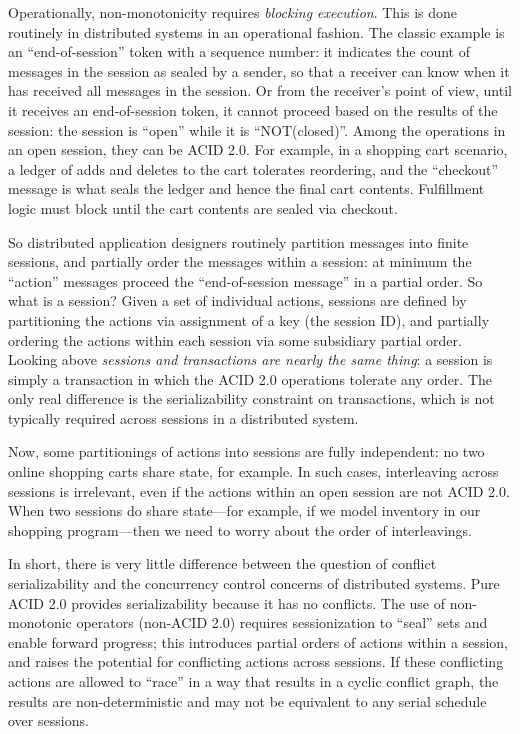 \documentclass{sig-alternate}
\begin{document}
Operationally, non-monotonicity requires \emph{blocking execution}. This is done
routinely in distributed systems in an operational fashion.  The classic example
is an ``end-of-session'' token with a sequence number: it indicates the count of
messages in the session as sealed by a sender, so that a receiver can know when
it has received all messages in the session.  Or from the receiver's point of
view, until it receives an end-of-session token, it cannot proceed based on the
results of the session: the session is ``open'' while it is ``NOT(closed)''.
Among the operations in an open session, they can be ACID 2.0.  For example, in
a shopping cart scenario, a ledger of adds and deletes to the cart tolerates
reordering, and the ``checkout'' message is what seals the ledger and hence the
final cart contents.  Fulfillment logic must block until the cart contents are
sealed via checkout.

So distributed application designers routinely partition messages into finite
sessions, and partially order the messages within a session: at minimum the
``action'' messages proceed the ``end-of-session message'' in a partial order.
So what is a session?  Given a set of individual actions, sessions are defined
by partitioning the actions via assignment of a key (the session ID), and
partially ordering the actions within each session via some subsidiary partial
order.  Looking above \emph{sessions and transactions are nearly the same
  thing}: a session is simply a transaction in which the ACID 2.0 operations
tolerate any order.  The only real difference is the serializability constraint
on transactions, which is not typically required across sessions in a
distributed system.

Now, some partitionings of actions into sessions are fully independent: no two
online shopping carts share state, for example.  In such cases, interleaving
across sessions is irrelevant, even if the actions within an open session are
not ACID 2.0.  When two sessions do share state---for example, if we model
inventory in our shopping program---then we need to worry about the order of
interleavings.

In short, there is very little difference between the question of conflict
serializability and the concurrency control concerns of distributed systems.
Pure ACID 2.0 provides serializability because it has no conflicts.  The use of
non-monotonic operators (non-ACID 2.0) requires sessionization to ``seal'' sets
and enable forward progress; this introduces partial orders of actions within a
session, and raises the potential for conflicting actions across sessions.  If
these conflicting actions are allowed to ``race'' in a way that results in a
cyclic conflict graph, the results are non-deterministic and may not be
equivalent to any serial schedule over sessions.
\end{document}
